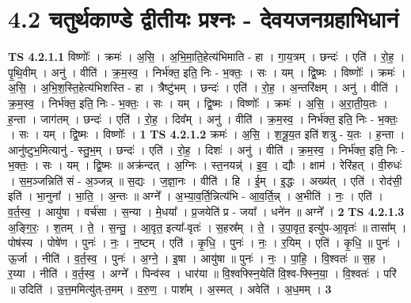 \documentclass[17pt]{extarticle}
\begin{document}
\section*{ 4.2      चतुर्थकाण्डे द्वीतीयः प्रश्नः - देवयजनग्रहाभिधानं }
                                \textbf{ TS 4.2.1.1} \newline
                  विष्णोः᳚ । क्रमः॑ । अ॒सि॒ । अ॒भि॒मा॒ति॒हेत्य॑भिमाति - हा । गा॒य॒त्रम् । छन्दः॑ । एति॑ । रो॒ह॒ । पृ॒थि॒वीम् । अनु॑ । वीति॑ । क्र॒म॒स्व॒ । निर्भ॑क्त॒ इति॒ निः - भ॒क्तः॒ । सः । यम् । द्वि॒ष्मः । विष्णोः᳚ । क्रमः॑ । अ॒सि॒ । अ॒भि॒श॒स्ति॒हेत्य॑भिशस्ति - हा । त्रैष्टु॑भम् । छन्दः॑ । एति॑ । रो॒ह॒ । अ॒न्तरि॑क्षम् । अनु॑ । वीति॑ । क्र॒म॒स्व॒ । निर्भ॑क्त॒ इति॒ निः - भ॒क्तः॒ । सः । यम् । द्वि॒ष्मः । विष्णोः᳚ । क्रमः॑ । अ॒सि॒ । अ॒रा॒ती॒य॒तः । ह॒न्ता । जाग॑तम् । छन्दः॑ । एति॑ । रो॒ह॒ । दिव᳚म् । अनु॑ । वीति॑ । क्र॒म॒स्व॒ । निर्भ॑क्त॒ इति॒ निः - भ॒क्तः॒ । सः । यम् । द्वि॒ष्मः । विष्णोः᳚ । \textbf{  1} \newline
                  \newline
                                \textbf{ TS 4.2.1.2} \newline
                  क्रमः॑ । अ॒सि॒ । श॒त्रू॒य॒त इति॑ शत्रु - य॒तः । ह॒न्ता । आनु॑ष्टुभ॒मित्यानु॑ - स्तु॒भ॒म् । छन्दः॑ । एति॑ । रो॒ह॒ । दिशः॑ । अनु॑ । वीति॑ । क्र॒म॒स्व॒ । निर्भ॑क्त॒ इति॒ निः - भ॒क्तः॒ । सः । यम् । द्वि॒ष्मः ॥ अक्र॑न्दत् । अ॒ग्निः । स्त॒नयन्न्॑ । इ॒व॒ । द्यौः । क्षाम॑ । रेरि॑हत् । वी॒रुधः॑ । स॒म॒ञ्जन्निति॑ सं - अ॒ञ्जन्न् ॥ स॒द्यः । ज॒ज्ञा॒नः । वीति॑ । हि । ई॒म् । इ॒द्धः । अख्य॑त् । एति॑ । रोद॑सी॒ इति॑ । भा॒नुना᳚ । भा॒ति॒ । अ॒न्तः ॥ अग्ने᳚ । अ॒भ्या॒व॒र्ति॒न्नित्य॑भि - आ॒व॒र्ति॒न्न् । अ॒भीति॑ । नः॒ । एति॑ । व॒र्त॒स्व॒ । आयु॑षा । वर्च॑सा । स॒न्या । मे॒धया᳚ । प्र॒जयेति॑ प्र - जया᳚ । धने॑न ॥ अग्ने᳚ । \textbf{  2} \newline
                  \newline
                                \textbf{ TS 4.2.1.3} \newline
                  अ॒ङ्गि॒रः॒ । श॒तम् । ते॒ । स॒न्तु॒ । आ॒वृत॒ इत्या᳚-वृतः॑ । स॒हस्र᳚म् । ते॒ । उ॒पा॒वृत॒ इत्यु॑प-आ॒वृतः॑ ॥ तासा᳚म् । पोष॑स्य । पोषे॑ण । पुनः॑ । नः॒ । न॒ष्टम् । एति॑ । कृ॒धि॒ । पुनः॑ । नः॒ । र॒यिम् । एति॑ । कृ॒धि॒ ॥ पुनः॑ । ऊ॒र्जा । नीति॑ । व॒र्त॒स्व॒ । पुनः॑ । अ॒ग्ने॒ । इ॒षा । आयु॑षा ॥ पुनः॑ । नः॒ । पा॒हि॒ । वि॒श्वतः॑ ॥ स॒ह । र॒य्या । नीति॑ । व॒र्त॒स्व॒ । अग्ने᳚ । पिन्व॑स्व । धार॑या ॥ वि॒श्वफ्स्नि॒येति॑ वि॒श्व-फ्स्नि॒या॒ । वि॒श्वतः॑ । परि॑ ॥ उदिति॑ । उ॒त्त॒ममित्यु॑त्-त॒मम् । व॒रु॒ण॒ । पाश᳚म् । अ॒स्मत् । अवेति॑ । अ॒ध॒मम् । \textbf{  3} \newline
\end{document}
